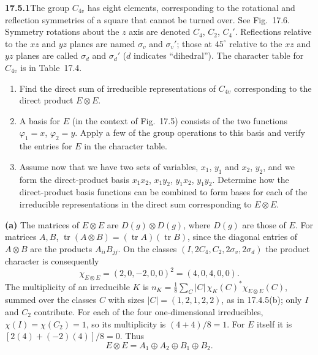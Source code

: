 \par\bigskip
\noindent\textbf{17.5.1}\quad The group $C_{4v}$ has eight elements,
corresponding to the rotational and reflection symmetries of a square
that cannot be turned over. See Fig.~17.6. Symmetry rotations about
the $z$ axis are denoted $C_{4}$, $C_{2}$, $C_{4}'$. Reflections
relative to the $xz$ and $yz$ planes are named $\sigma_{v}$ and
$\sigma_{v}'$; those at $45^{\circ}$ relative to the $xz$ and $yz$
planes are called $\sigma_{d}$ and $\sigma_{d}'$ ($d$ indicates
``dihedral''). The character table for $C_{4v}$ is in Table~17.4.
\begin{enumerate}
\item[(a)] Find the direct sum of irreducible representations of
$C_{4v}$ corresponding to the direct product $E\otimes E$.
\item[(b)] A basis for $E$ (in the context of Fig.~17.5) consists of
the two functions $\varphi_{1}=x$, $\varphi_{2}=y$. Apply a few of
the group operations to this basis and verify the entries for $E$ in
the character table.
\item[(c)] Assume now that we have two sets of variables, $x_{1}$,
$y_{1}$ and $x_{2}$, $y_{2}$, and we form the direct-product basis
$x_{1}x_{2}$, $x_{1}y_{2}$, $y_{1}x_{2}$, $y_{1}y_{2}$. Determine how
the direct-product basis functions can be combined to form bases for
each of the irreducible representations in the direct sum
corresponding to $E\otimes E$.
\end{enumerate}
\solution
\textbf{(a)} The matrices of $E\otimes E$ are $D(g)\otimes D(g)$,
where $D(g)$ are those of $E$. For matrices $A,B$,
$\operatorname{tr}(A\otimes B)=(\operatorname{tr}A)(\operatorname{tr}B)$,
since the diagonal entries of $A\otimes B$ are the products
$A_{ii}B_{jj}$. On the classes $(I,2C_4,C_2,2\sigma_v,2\sigma_d)$
the product character is consequently
\[
\chi_{E\otimes E}=(2,0,-2,0,0)^2=(4,0,4,0,0).
\]
The multiplicity of an irreducible $K$ is
$n_K=\frac18\sum_C|C|\,\chi_K(C)^*\chi_{E\otimes E}(C)$, summed over
the classes $C$ with sizes $|C|=(1,2,1,2,2)$, as in 17.4.5(b);
only $I$ and $C_2$ contribute.
For each of the four one-dimensional irreducibles,
$\chi(I)=\chi(C_2)=1$, so its multiplicity is
$(4+4)/8=1$. For $E$ itself it is
$[2(4)+(-2)(4)]/8=0$. Thus
\[
\boxed{E\otimes E=A_1\oplus A_2\oplus B_1\oplus B_2}.
\]

